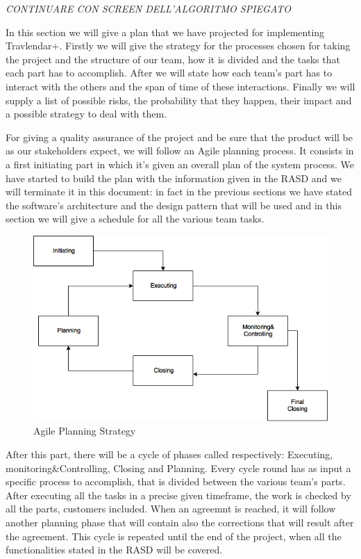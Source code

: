 
\emph{ \huge CONTINUARE CON SCREEN DELL'ALGORITMO SPIEGATO}

In this section we will give a plan that we have projected for implementing Travlendar+. 
Firstly we will give the strategy for the processes chosen for taking the project and the structure of our team, how it is divided and the tasks that each part has to accomplish.
After we will state how each team’s part has to interact with the others and the span of time of these interactions. 
Finally we will supply a list of possible risks, the probability that they happen, their impact and a possible strategy to deal with them.

For giving a quality assurance of the project and be sure that the product will be as our stakeholders expect, we will follow an Agile planning process. It consists in a first initiating part in which it’s given an overall plan of the system process. We have started to build the plan with the information given in the RASD and we will terminate it in this document: in fact in the previous sections we have stated the software’s architecture and the design pattern that will be used and in this section we will give a schedule for all the various team tasks.
\begin{figure}[H]
	\centering
	\includegraphics[scale=0.35]{Images/Implementation/Agile_Planning}
	\caption{Agile Planning Strategy}
\end{figure}
After this part, there will be a cycle of phases called respectively: Executing, monitoring\&Controlling, Closing and Planning. 
Every cycle round has as input a specific process to accomplish, that is divided between the various team’s parts. After executing all the tasks in a precise given timeframe, the work is checked by all the parts, customers included. When an agreemnt is reached, it will follow another planning phase that will contain also the corrections that will result after the agreement.
This cycle is repeated until the end of the project, when all the functionalities stated in the RASD will be covered.

